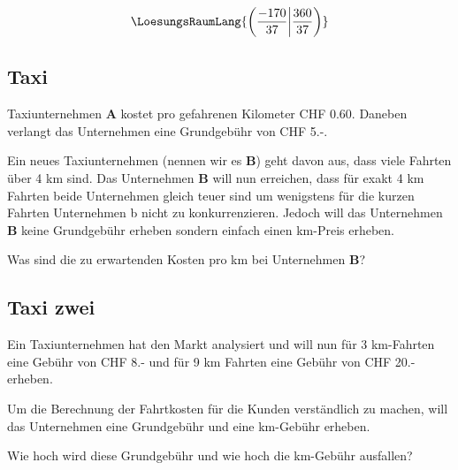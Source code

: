 \vspace{15mm}

$$\LoesungsRaumLang{\left( \frac{-170}{37} \middle| \frac{360}{37} \right)}$$

\subsection{Taxi}
Taxiunternehmen \textbf{A} kostet pro gefahrenen Kilometer CHF
0.60. Daneben verlangt das Unternehmen eine Grundgebühr von CHF 5.-.

Ein neues Taxiunternehmen (nennen wir es \textbf{B}) geht davon aus, dass viele Fahrten über 4 km
sind. Das Unternehmen \textbf{B} will nun erreichen, dass für exakt 4
km Fahrten beide Unternehmen gleich teuer sind um wenigstens für die
kurzen Fahrten Unternehmen b nicht zu konkurrenzieren. Jedoch will das
Unternehmen \textbf{B} keine Grundgebühr erheben sondern einfach einen
km-Preis erheben.

Was sind die zu erwartenden Kosten pro km bei Unternehmen \textbf{B}?

\subsection{Taxi zwei}
Ein Taxiunternehmen hat den Markt analysiert und will nun für 3
km-Fahrten  eine Gebühr von CHF 8.- und für 9 km Fahrten eine Gebühr
von CHF 20.- erheben.

Um die Berechnung der Fahrtkosten für die Kunden verständlich zu
machen, will das Unternehmen eine Grundgebühr und eine km-Gebühr
erheben.

Wie hoch wird diese Grundgebühr und wie hoch die km-Gebühr ausfallen?



